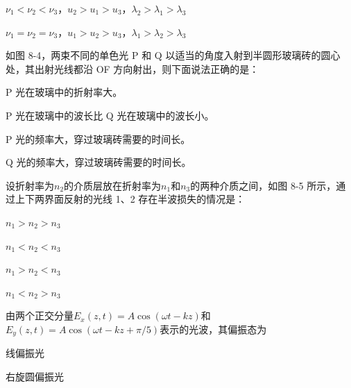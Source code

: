 \documentclass[standard, analysis, notocnum]{ExBook}
\newcommand{\answerarea}[1][8cm]{%
  \par\vspace{2mm}%
  \noindent{\color{themeColor!35}\rule{\linewidth}{0.4pt}}\par
  \noindent\begin{minipage}[t][#1][t]{\linewidth}\vspace{0pt}\end{minipage}\par
  \noindent{\color{themeColor!35}\rule{\linewidth}{0.4pt}}\par
}
\begin{document}
\begin{qitems}
\begin{bbox}
\par\noindent\hspace{2em}$\nu_{1}<\nu_{2}<\nu_{3}$，$u_{2}>u_{1}>u_{3}$，$\lambda_{2}>\lambda_{1}>\lambda_{3}$
\par\noindent\hspace{2em}$\nu_{1}=\nu_{2}=\nu_{3}$，$u_{1}>u_{2}>u_{3}$，$\lambda_{1}>\lambda_{2}>\lambda_{3}$
\answerarea[3.5cm]
\end{bbox}
\begin{bbox}
\qitem 如图 8-4，两束不同的单色光 P 和 Q 以适当的角度入射到半圆形玻璃砖的圆心处，其出射光线都沿 OF 方向射出，则下面说法正确的是：
\par\noindent\hspace{2em}P 光在玻璃中的折射率大。
\par\noindent\hspace{2em}P 光在玻璃中的波长比 Q 光在玻璃中的波长小。
\par\noindent\hspace{2em}P 光的频率大，穿过玻璃砖需要的时间长。
\par\noindent\hspace{2em}Q 光的频率大，穿过玻璃砖需要的时间长。
\answerarea[3.5cm]
\end{bbox}
\begin{bbox}
\qitem 设折射率为$n_{2}$的介质层放在折射率为$n_{1}$和$n_{3}$的两种介质之间，如图 8-5 所示，通过上下两界面反射的光线 1、2 存在半波损失的情况是：
\par\noindent\hspace{2em}$n_{1}>n_{2}>n_{3}$
\par\noindent\hspace{2em}$n_{1}<n_{2}<n_{3}$
\par\noindent\hspace{2em}$n_{1}>n_{2}<n_{3}$
\par\noindent\hspace{2em}$n_{1}<n_{2}>n_{3}$
\answerarea[3.5cm]
\end{bbox}
\begin{bbox}
\qitem 由两个正交分量$E_{x}(z,t)=A\cos (\omega t-kz)$和$E_{y}(z,t)=A\cos (\omega t-kz+\pi /5)$表示的光波，其偏振态为
\par\noindent\hspace{2em}线偏振光
\par\noindent\hspace{2em}右旋圆偏振光

\end{bbox}
\end{qitems}
\end{document}
